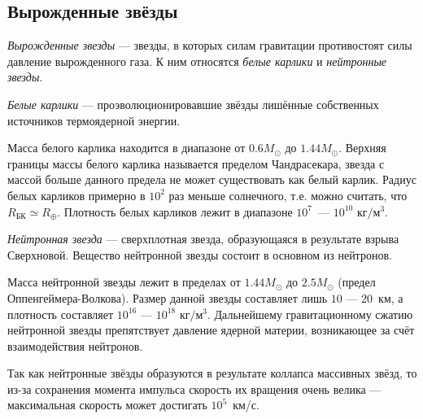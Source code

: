 \subsection{Вырожденные звёзды}
\textit{Вырожденные звезды} --- звезды, в которых силам гравитации противостоят силы давление вырожденного газа. К ним относятся \textit{белые карлики} и \textit{нейтронные звезды}. 

\textit{Белые карлики} --- проэволюционировавшие звёзды лишённые собственных источников термоядерной энергии. 

Масса белого карлика находится в диапазоне от $0.6M_{\odot}$ до $1.44 M_{\odot}$. Верхняя границы массы белого карлика называется пределом Чандрасекара, звезда с массой больше данного предела не может существовать как белый карлик. Радиус белых карликов примерно в $10^2$ раз меньше солнечного, т.е. можно считать, что $R_\text{БК} \simeq R_\oplus$. Плотность белых карликов лежит в диапазоне $10^7$~--- $10^{10}$ $\text{кг}/\text{м}^3$.

\textit{Нейтронная звезда} --- сверхплотная звезда, образующаяся в результате взрыва Сверхновой. Вещество нейтронной звезды состоит в основном из нейтронов.

Масса нейтронной звезды лежит в пределах от $1.44M_{\odot}$ до $2.5M_{\odot}$ (предел Оппенгеймера-Волкова). Размер данной звезды составляет лишь $10$ --- $20$~км, а плотность составляет $10^{16}$ --- $10^{18}$ $\text{кг}/\text{м}^3$.  Дальнейшему гравитационному сжатию нейтронной звезды препятствует давление ядерной материи, возникающее за счёт взаимодействия нейтронов.

Так как нейтронные звёзды образуются в результате  коллапса массивных звёзд, то из-за сохранения момента импульса скорость их вращения очень велика --- максимальная скорость может достигать $10^5$~км/с.